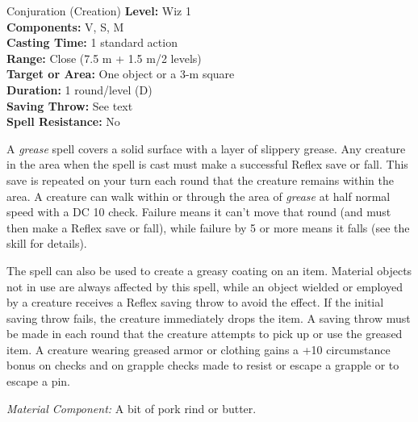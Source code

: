 {Conjuration (Creation)}
{
	\textbf{Level:}
	Wiz 1\\
	\textbf{Components:}
	V, S, M\\
	\textbf{Casting Time:}
	1 standard action\\
	\textbf{Range:}
	Close (7.5 m + 1.5 m/2 levels)\\
	\textbf{Target or Area:}
	One object or a 3-m square\\
	\textbf{Duration:}
	1 round/level (D)\\
	\textbf{Saving Throw:}
	See text\\
	\textbf{Spell Resistance:}
	No\\
}
{
	A \emph{grease} spell covers a solid surface with a layer of slippery grease. Any creature in the area when the spell is cast must make a successful Reflex save or fall. This save is repeated on your turn each round that the creature remains within the area. A creature can walk within or through the area of \emph{grease} at half normal speed with a DC 10  check. Failure means it can't move that round (and must then make a Reflex save or fall), while failure by 5 or more means it falls (see the  skill for details).

	The spell can also be used to create a greasy coating on an item. Material objects not in use are always affected by this spell, while an object wielded or employed by a creature receives a Reflex saving throw to avoid the effect. If the initial saving throw fails, the creature immediately drops the item. A saving throw must be made in each round that the creature attempts to pick up or use the greased item. A creature wearing greased armor or clothing gains a +10 circumstance bonus on  checks and on grapple checks made to resist or escape a grapple or to escape a pin.

	\textit{Material Component:}
	A bit of pork rind or butter.

}
